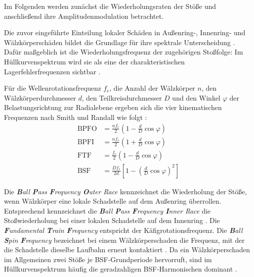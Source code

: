 Im Folgenden werden zunächst die Wiederholungsraten der Stöße und anschließend
ihre Amplitudenmodulation betrachtet.

\label{par:charakteristische_lagerschadensfrequenzen}
Die zuvor eingeführte Einteilung lokaler Schäden in Außenring-, Innenring-
und Wälzkörperschäden
bildet die Grundlage für ihre spektrale Unterscheidung
\cite[S.~486--487, Abschn.~1 und Abb.~1]
{randallRollingElementBearing2011a}. Dafür maßgeblich ist die Wiederholungsfrequenz
der zugehörigen Stoßfolge: Im Hüllkurvenspektrum wird sie als eine der
charakteristischen Lagerfehlerfrequenzen sichtbar
\cite[S.~101--102, Abschn.~2 und Abb.~1]
{smithRollingElementBearing2015}.

Für die Wellenrotationsfrequenz $f_r$, die Anzahl der Wälzkörper $n$, den
Wälzkörperdurchmesser $d$, den Teilkreisdurchmesser $D$ und den Winkel
$\varphi$ der Belastungsrichtung zur Radialebene ergeben sich die vier
kinematischen Frequenzen nach Smith und Randall wie folgt
\cite[S.~102, Abschn.~2, Gleichungsblock und Nomenklatur]
{smithRollingElementBearing2015}:
\begin{align}
    \mathrm{BPFO}
        &= \frac{n f_r}{2}
           \left(1-\frac{d}{D}\cos\varphi\right)
           \label{eq:bpfo}\\[1ex]
    \mathrm{BPFI}
        &= \frac{n f_r}{2}
           \left(1+\frac{d}{D}\cos\varphi\right)
           \label{eq:bpfi}\\[1ex]
    \mathrm{FTF}
        &= \frac{f_r}{2}
           \left(1-\frac{d}{D}\cos\varphi\right)
           \label{eq:ftf}\\[1ex]
    \mathrm{BSF}
        &= \frac{D f_r}{2d}
           \left[1-\left(\frac{d}{D}\cos\varphi\right)^2\right]
           \label{eq:bsf}
\end{align}

Die \emph{\textbf{B}all \textbf{P}ass \textbf{F}requency \textbf{O}uter Race}
kennzeichnet die Wiederholung
der Stöße, wenn Wälzkörper eine lokale Schadstelle auf dem Außenring
überrollen. Entsprechend kennzeichnet die
\emph{\textbf{B}all \textbf{P}ass \textbf{F}requency \textbf{I}nner Race}
die Stoßwiederholung bei einer lokalen Schadstelle auf dem Innenring
\cite[S.~486--487, Abschn.~1, Abb.~1 und Gl.~(1)--(2)]
{randallRollingElementBearing2011a}.
Die \emph{\textbf{F}undamental \textbf{T}rain \textbf{F}requency}
entspricht der Käfigrotationsfrequenz. Die
\emph{\textbf{B}all \textbf{S}pin \textbf{F}requency}
bezeichnet bei einem Wälzkörperschaden die Frequenz, mit der die
Schadstelle dieselbe Laufbahn erneut kontaktiert
\cite[S.~486--487, Abb.~1 und Gl.~(3)--(4)]
{randallRollingElementBearing2011a}. Da ein Wälzkörperschaden im Allgemeinen
zwei Stöße je BSF-Grundperiode hervorruft, sind im Hüllkurvenspektrum häufig
die geradzahligen BSF-Harmonischen dominant
\cite[S.~487, Absatz nach Gl.~(4)]
{randallRollingElementBearing2011a}
\cite[S.~103, Tab.~1]{smithRollingElementBearing2015}.

